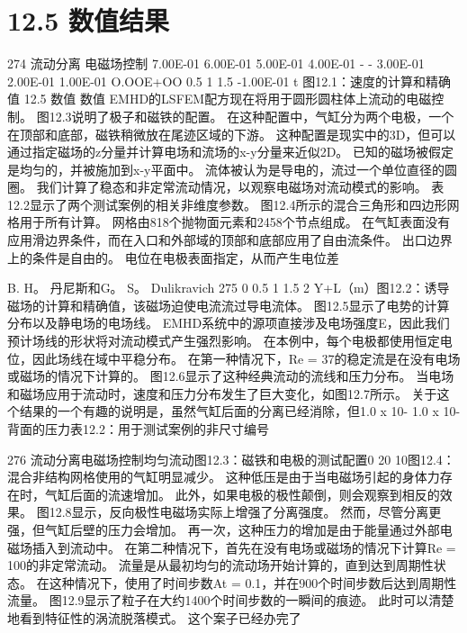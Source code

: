 \documentclass[UTF8,11pt,a4paper,openany,fontset=fandol]{ctexbook}
\begin{document}
\section{12.5 数值结果}
274 流动分离 电磁场控制 7.00E-01 6.00E-01 5.00E-01 4.00E-01 - - 3.00E-01 2.00E-01 1.00E-01 O.OOE+OO 0.5 1 1.5 -1.00E-01 t 图12.1：速度的计算和精确值 12.5 数值 数值 EMHD的LSFEM配方现在将用于圆形圆柱体上流动的电磁控制。 图12.3说明了极子和磁铁的配置。 在这种配置中，气缸分为两个电极，一个在顶部和底部，磁铁稍微放在尾迹区域的下游。 这种配置是现实中的3D，但可以通过指定磁场的z分量并计算电场和流场的x-y分量来近似2D。 已知的磁场被假定是均匀的，并被施加到x-y平面中。 流体被认为是导电的，流过一个单位直径的圆圈。 我们计算了稳态和非定常流动情况，以观察电磁场对流动模式的影响。 表12.2显示了两个测试案例的相关非维度参数。 图12.4所示的混合三角形和四边形网格用于所有计算。 网格由818个抛物面元素和2458个节点组成。 在气缸表面没有应用滑边界条件，而在入口和外部域的顶部和底部应用了自由流条件。 出口边界上的条件是自由的。 电位在电极表面指定，从而产生电位差

B. H。 丹尼斯和G。 S。 Dulikravich 275 0 0.5 1 1.5 2 Y+L（m）图12.2：诱导磁场的计算和精确值，该磁场迫使电流流过导电流体。 图12.5显示了电势的计算分布以及静电场的电场线。 EMHD系统中的源项直接涉及电场强度E，因此我们预计场线的形状将对流动模式产生强烈影响。 在本例中，每个电极都使用恒定电位，因此场线在域中平稳分布。 在第一种情况下，Re = 37的稳定流是在没有电场或磁场的情况下计算的。 图12.6显示了这种经典流动的流线和压力分布。 当电场和磁场应用于流动时，速度和压力分布发生了巨大变化，如图12.7所示。 关于这个结果的一个有趣的说明是，虽然气缸后面的分离已经消除，但1.0 x 10- 1.0 x 10-背面的压力表12.2：用于测试案例的非尺寸编号

276 流动分离电磁场控制均匀流动图12.3：磁铁和电极的测试配置0 20 10图12.4：混合非结构网格使用的气缸明显减少。 这种低压是由于当电磁场引起的身体力存在时，气缸后面的流速增加。 此外，如果电极的极性颠倒，则会观察到相反的效果。 图12.8显示，反向极性电磁场实际上增强了分离强度。 然而，尽管分离更强，但气缸后壁的压力会增加。 再一次，这种压力的增加是由于能量通过外部电磁场插入到流动中。 在第二种情况下，首先在没有电场或磁场的情况下计算Re = 100的非定常流动。 流量是从最初均匀的流动场开始计算的，直到达到周期性状态。 在这种情况下，使用了时间步数At = 0.1，并在900个时间步数后达到周期性流量。 图12.9显示了粒子在大约1400个时间步数的一瞬间的痕迹。 此时可以清楚地看到特征性的涡流脱落模式。 这个案子已经办完了
\end{document}
